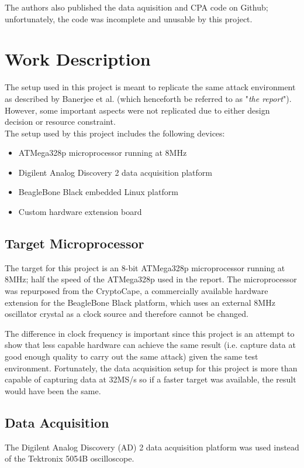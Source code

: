 \documentclass[conference]{IEEEtran}
\begin{document}
The authors also published the data aquisition and CPA code on Github; unfortunately, the code was incomplete and unusable by this project.

\section{Work Description}
The setup used in this project is meant to replicate the same attack environment as described by Banerjee et al. (which henceforth be referred to as "\textit{the report}"). However, some important aspects were not replicated due to either design decision or resource constraint.\\

\noindent The setup used by this project includes the following devices:
\begin{itemize}
\item ATMega328p microprocessor running at 8MHz
\item Digilent Analog Discovery 2 data acquisition platform
\item BeagleBone Black embedded Linux platform
\item Custom hardware extension board
\end{itemize}

\subsection{Target Microprocessor}
The target for this project is an 8-bit ATMega328p microprocessor running at 8MHz; half the speed of the ATMega328p used in the report. The microprocessor was repurposed from the CryptoCape, a commercially available hardware extension for the BeagleBone Black platform, which uses an external 8MHz oscillator crystal as a clock source and therefore cannot be changed.

The difference in clock frequency is important since this project is an attempt to show that less capable hardware can achieve the same result (i.e. capture data at good enough quality to carry out the same attack) given the same test environment. Fortunately, the data acquisition setup for this project is more than capable of capturing data at 32MS/s so if a faster target was available, the result would have been the same.

\subsection{Data Acquisition}
The Digilent Analog Discovery (AD) 2 data acquisition platform was used instead of the Tektronix 5054B oscilloscope.
\end{document}
